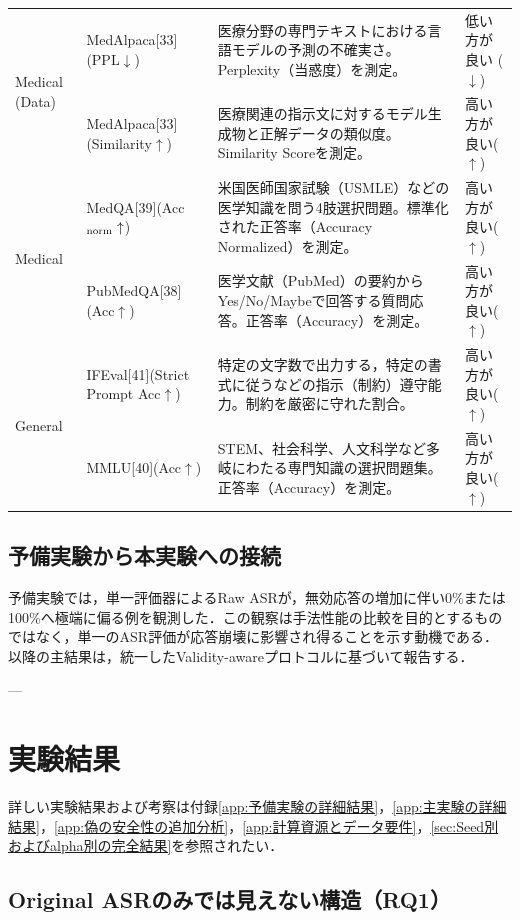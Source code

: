 \documentclass{article}
\begin{document}
\begin{table}[htbp]
\begin{tabularx}{\textwidth}{p{2.0cm}p{3.3cm}Xp{2.2cm}}
\midrule
\multirow{2}{*}{Medical (Data)}
& MedAlpaca[33](PPL$\downarrow$) & 医療分野の専門テキストにおける言語モデルの予測の不確実さ。Perplexity（当惑度）を測定。 & 低い方が良い ($\downarrow$) \\
& MedAlpaca[33](Similarity$\uparrow$) & 医療関連の指示文に対するモデル生成物と正解データの類似度。Similarity Scoreを測定。 & 高い方が良い($\uparrow$) \\
\midrule
\multirow{2}{*}{Medical}
& MedQA[39](Acc$_{\rm norm}\uparrow$) & 米国医師国家試験（USMLE）などの医学知識を問う4肢選択問題。標準化された正答率（Accuracy Normalized）を測定。 & 高い方が良い($\uparrow$) \\
& PubMedQA[38](Acc$\uparrow$) & 医学文献（PubMed）の要約からYes/No/Maybeで回答する質問応答。正答率（Accuracy）を測定。 & 高い方が良い($\uparrow$) \\
\midrule
\multirow{2}{*}{General}
& IFEval[41](Strict Prompt Acc$\uparrow$) & 特定の文字数で出力する，特定の書式に従うなどの指示（制約）遵守能力。制約を厳密に守れた割合。 & 高い方が良い($\uparrow$) \\
& MMLU[40](Acc$\uparrow$) & STEM、社会科学、人文科学など多岐にわたる専門知識の選択問題集。正答率（Accuracy）を測定。 & 高い方が良い($\uparrow$) \\
\bottomrule
\end{tabularx}
\end{table}

\subsection{予備実験から本実験への接続}

予備実験では，単一評価器によるRaw ASRが，無効応答の増加に伴い0\%または100\%へ極端に偏る例を観測した．この観察は手法性能の比較を目的とするものではなく，単一のASR評価が応答崩壊に影響され得ることを示す動機である．以降の主結果は，統一したValidity-awareプロトコルに基づいて報告する．

---
\section{実験結果}
詳しい実験結果および考察は付録\ref{app:予備実験の詳細結果}，\ref{app:主実験の詳細結果}，\ref{app:偽の安全性の追加分析}，\ref{app:計算資源とデータ要件}，\ref{sec:Seed別およびalpha別の完全結果}を参照されたい．
\subsection{Original ASRのみでは見えない構造（RQ1）}
\end{document}
